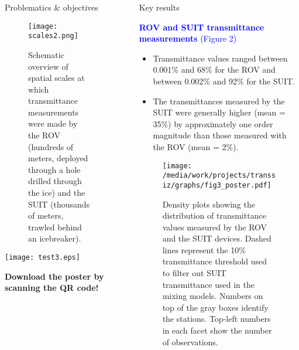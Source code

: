 \documentclass[final]{beamer}
\newlength{\sepwidth}
\newlength{\colwidth}
\newcommand{\separatorcolumn}{\begin{column}{\sepwidth}\end{column}}
\begin{document}
\begin{frame}[t]
\begin{columns}[t]
\begin{column}{\colwidth}
\begin{block}{Problematics \& objectives}
				\begin{figure}
					\centering
					\texttt{[image: scales2.png]}
					\caption{Schematic overview of spatial scales at which transmittance measurements were made by the ROV (hundreds of meters, deployed through a hole drilled through the ice) and the SUIT (thousands of meters, trawled behind an icebreaker).}
				\end{figure}

			\end{block}

			\vspace{3.5cm}
			\begin{minipage}[c]{0.175\textwidth}
				\texttt{[image: test3.eps]}
			\end{minipage}
			\begin{minipage}[c]{0.75\textwidth}
				{\large \textbf{Download the poster by scanning the QR code!}}
			\end{minipage}

		\end{column}

		\separatorcolumn

		\begin{column}{\colwidth}

			\begin{block}{Key results}

				\textcolor{blue}{\large \textbf{ROV and SUIT transmittance measurements} (Figure 2)}

				\begin{itemize}
					\justifying
					\setlength\itemsep{1em}
					\item Transmittance values ranged between 0.001\% and 68\% for the ROV and between 0.002\% and 92\% for the SUIT.
					\item The transmittances measured by the SUIT were generally higher (mean = 35\%) by approximately one order magnitude than those measured with the ROV (mean = 2\%).
				\end{itemize}

				\begin{figure}
					\centering
					\texttt{[image: /media/work/projects/transsiz/graphs/fig3\_poster.pdf]}
					\caption{Density plots showing the distribution of transmittance values measured by the ROV and the SUIT devices. Dashed lines represent the 10\% transmittance threshold used to filter out SUIT transmittance used in the mixing models. Numbers on top of the gray boxes identify the stations. Top-left numbers in each facet show the number of observations.}
				\end{figure}


\end{block}
\end{column}
\end{columns}
\end{frame}
\end{document}
